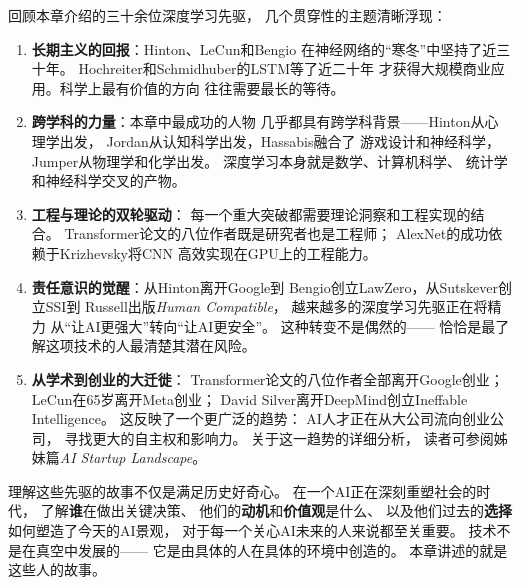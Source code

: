 回顾本章介绍的三十余位深度学习先驱，
几个贯穿性的主题清晰浮现：

\begin{enumerate}[noitemsep]
  \item \textbf{长期主义的回报}：Hinton、LeCun和Bengio
    在神经网络的``寒冬''中坚持了近三十年。
    Hochreiter和Schmidhuber的LSTM等了近二十年
    才获得大规模商业应用。科学上最有价值的方向
    往往需要最长的等待。

  \item \textbf{跨学科的力量}：本章中最成功的人物
    几乎都具有跨学科背景——Hinton从心理学出发，
    Jordan从认知科学出发，Hassabis融合了
    游戏设计和神经科学，Jumper从物理学和化学出发。
    深度学习本身就是数学、计算机科学、
    统计学和神经科学交叉的产物。

  \item \textbf{工程与理论的双轮驱动}：
    每一个重大突破都需要理论洞察和工程实现的结合。
    Transformer论文的八位作者既是研究者也是工程师；
    AlexNet的成功依赖于Krizhevsky将CNN
    高效实现在GPU上的工程能力。

  \item \textbf{责任意识的觉醒}：从Hinton离开Google到
    Bengio创立LawZero，从Sutskever创立SSI到
    Russell出版\textit{Human Compatible}，
    越来越多的深度学习先驱正在将精力
    从``让AI更强大''转向``让AI更安全''。
    这种转变不是偶然的——
    恰恰是最了解这项技术的人最清楚其潜在风险。

  \item \textbf{从学术到创业的大迁徙}：
    Transformer论文的八位作者全部离开Google创业；
    LeCun在65岁离开Meta创业；
    David Silver离开DeepMind创立Ineffable Intelligence。
    这反映了一个更广泛的趋势：
    AI人才正在从大公司流向创业公司，
    寻找更大的自主权和影响力。
    关于这一趋势的详细分析，
    读者可参阅姊妹篇\textit{AI Startup Landscape}。
\end{enumerate}

\begin{whybox}
理解这些先驱的故事不仅是满足历史好奇心。
在一个AI正在深刻重塑社会的时代，
了解\textbf{谁}在做出关键决策、
他们的\textbf{动机}和\textbf{价值观}是什么、
以及他们过去的\textbf{选择}如何塑造了今天的AI景观，
对于每一个关心AI未来的人来说都至关重要。
技术不是在真空中发展的——
它是由具体的人在具体的环境中创造的。
本章讲述的就是这些人的故事。
\end{whybox}
